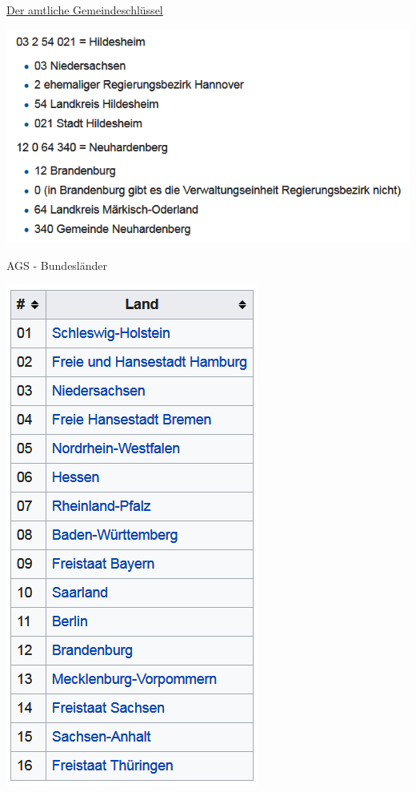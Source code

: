\documentclass[ignorenonframetext,]{beamer}
\begin{document}
\begin{frame}{\href{https://de.wikipedia.org/wiki/Amtlicher_Gemeindeschl\%C3\%BCssel}{Der
amtliche Gemeindeschlüssel}}
\protect\hypertarget{der-amtliche-gemeindeschlussel}{}

\includegraphics{figure/ags_beispiele.PNG}

\end{frame}

\begin{frame}{AGS - Bundesländer}
\protect\hypertarget{ags---bundeslander}{}

\includegraphics{figure/AGS_BLA.PNG}

\end{frame}
\end{document}

